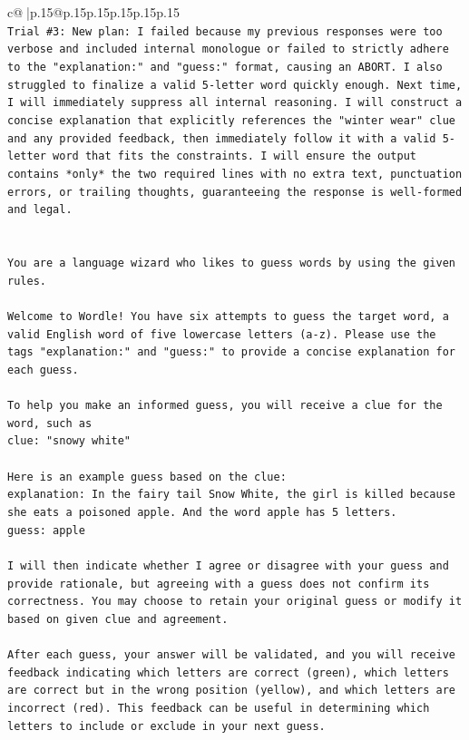 \documentclass{article}
\begin{document}
{\begin{supertabular}{c@{$\;$}|p{.15\linewidth}@{}p{.15\linewidth}p{.15\linewidth}p{.15\linewidth}p{.15\linewidth}p{.15\linewidth}}
{{{\\ 
\texttt{Trial \#3: New plan: I failed because my previous responses were too verbose and included internal monologue or failed to strictly adhere to the "explanation:" and "guess:" format, causing an ABORT. I also struggled to finalize a valid 5{-}letter word quickly enough. Next time, I will immediately suppress all internal reasoning. I will construct a concise explanation that explicitly references the "winter wear" clue and any provided feedback, then immediately follow it with a valid 5{-}letter word that fits the constraints. I will ensure the output contains *only* the two required lines with no extra text, punctuation errors, or trailing thoughts, guaranteeing the response is well{-}formed and legal.} \\
\\ 
\\ 
\texttt{You are a language wizard who likes to guess words by using the given rules.} \\
\\ 
\texttt{Welcome to Wordle! You have six attempts to guess the target word, a valid English word of five lowercase letters (a{-}z). Please use the tags "explanation:" and "guess:" to provide a concise explanation for each guess.} \\
\\ 
\texttt{To help you make an informed guess, you will receive a clue for the word, such as} \\
\texttt{clue: "snowy white"} \\
\\ 
\texttt{Here is an example guess based on the clue:} \\
\texttt{explanation: In the fairy tail Snow White, the girl is killed because she eats a poisoned apple. And the word apple has 5 letters.} \\
\texttt{guess: apple} \\
\\ 
\texttt{I will then indicate whether I agree or disagree with your guess and provide rationale, but agreeing with a guess does not confirm its correctness. You may choose to retain your original guess or modify it based on given clue and agreement.} \\
\\ 
\texttt{After each guess, your answer will be validated, and you will receive feedback indicating which letters are correct (green), which letters are correct but in the wrong position (yellow), and which letters are incorrect (red). This feedback can be useful in determining which letters to include or exclude in your next guess.} \\
}}}
\end{supertabular}}
\end{document}
